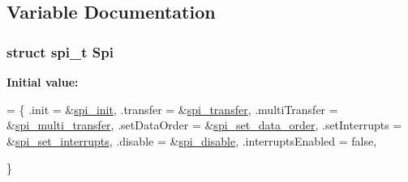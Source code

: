 \subsection{Variable Documentation}
\hypertarget{a00015_acc32e9917e484a47a14e3daccb502db2}{
\subsubsection[{Spi}]{\setlength{\rightskip}{0pt plus 5cm}struct {\bf spi\-\_\-t} Spi\hspace{0.3cm}{\ttfamily [static]}}}\label{a00015_acc32e9917e484a47a14e3daccb502db2}
{\bfseries Initial value\-:}
\begin{DoxyCode}
= \{
  .init = &\hyperlink{a00015_a94087004a94105cf6d70f8ea90af2408}{spi\_init},
  .transfer = &\hyperlink{a00015_aab1ad15333780e6b9f8c8be602682818}{spi\_transfer},
  .multiTransfer = &\hyperlink{a00015_a106510ceb36305d7442f75e830fb98c2}{spi\_multi\_transfer},
  .setDataOrder = &\hyperlink{a00015_a5d5bcfa359b4591e38b5d533d624216e}{spi\_set\_data\_order},
  .setInterrupts = &\hyperlink{a00015_a61cfa0c122508d59bd38c2046b1e6ebf}{spi\_set\_interrupts},
  .disable = &\hyperlink{a00015_a1b20de0da423e7d6da1c99eec9d63216}{spi\_disable},
  .interruptsEnabled = \textcolor{keyword}{false},



\}
\end{DoxyCode}
